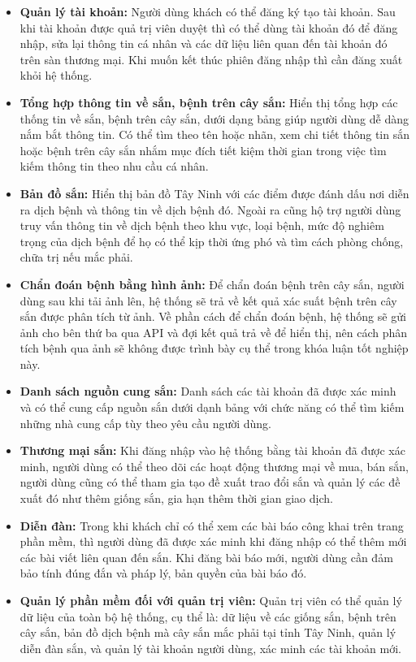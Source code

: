 \documentclass[./../main.tex]{subfiles}
\begin{document}
\begin{itemize} 
    \item \textbf{Quản lý tài khoản:} Người dùng khách có thể đăng ký tạo tài khoản. Sau khi tài khoản được quả trị viên duyệt thì có thể dùng tài khoản đó để đăng nhập, sửa lại thông tin cá nhân và các dữ liệu liên quan đến tài khoản đó trên sàn thương mại. Khi muốn kết thúc phiên đăng nhập thì cần đăng xuất khỏi hệ thống.
    \item \textbf{Tổng hợp thông tin về sắn, bệnh trên cây sắn:} Hiển thị tổng hợp các thống tin về sắn, bệnh trên cây sắn, dưới dạng bảng giúp người dùng dễ dàng nắm bắt thông tin. Có thể tìm theo tên hoặc nhãn, xem chi tiết thông tin sắn hoặc bệnh trên cây sắn nhắm mục đích tiết kiệm thời gian trong việc tìm kiếm thông tin theo nhu cầu cá nhân.
    \item \textbf{Bản đồ sắn:} Hiển thị bản đồ Tây Ninh với các điểm được đánh dấu nơi diễn ra dịch bệnh và thông tin về dịch bệnh đó. Ngoài ra cũng hộ trợ người dùng truy vấn thông tin về dịch bệnh theo khu vực, loại bệnh, mức độ nghiêm trọng của dịch bệnh để họ có thể kịp thời ứng phó và tìm cách phòng chống, chữa trị nếu mắc phải.
    \item \textbf{Chẩn đoán bệnh bằng hình ảnh:} Để chẩn đoán bệnh trên cây sắn, người dùng sau khi tải ảnh lên, hệ thống sẽ trả về kết quả xác suất bệnh trên cây sắn được phân tích từ ảnh. Về phần cách để chẩn đoán bệnh, hệ thống sẽ gửi ảnh cho bên thứ ba qua API và đợi kết quả trả về để hiển thị, nên cách phân tích bệnh qua ảnh sẽ không được trình bày cụ thể trong khóa luận tốt nghiệp này.
    \item \textbf{Danh sách nguồn cung sắn:} Danh sách các tài khoản đã được xác minh và có thể cung cấp nguồn sắn dưới dạnh bảng với chức năng có thể tìm kiếm những nhà cung cấp tùy theo yêu cầu người dùng.
    \item \textbf{Thương mại sắn:} Khi đăng nhập vào hệ thống bằng tài khoản đã được xác minh, người dùng có thể theo dõi các hoạt động thương mại về mua, bán sắn, người dùng cũng có thể tham gia tạo đề xuất trao đổi sắn và quản lý các đề xuất đó như thêm giống sắn, gia hạn thêm thời gian giao dịch.
    \item \textbf{Diễn đàn:} Trong khi khách chỉ có thể xem các bài báo công khai trên trang phần mềm, thì người dùng đã được xác minh khi đăng nhập có thể thêm mới các bài viết liên quan đến sắn. Khi đăng bài báo mới, người dùng cần đảm bảo tính đúng đắn và pháp lý, bản quyền của bài báo đó.
    \item \textbf{Quản lý phần mềm đối với quản trị viên:} Quản trị viên có thể quản lý dữ liệu của toàn bộ hệ thống, cụ thể là: dữ liệu về các giống sắn, bệnh trên cây sắn, bản đồ dịch bệnh mà cây sắn mắc phải tại tỉnh Tây Ninh, quản lý diễn đàn sắn, và quản lý tài khoản người dùng, xác minh các tài khoản mới.
\end{itemize}
\end{document}
